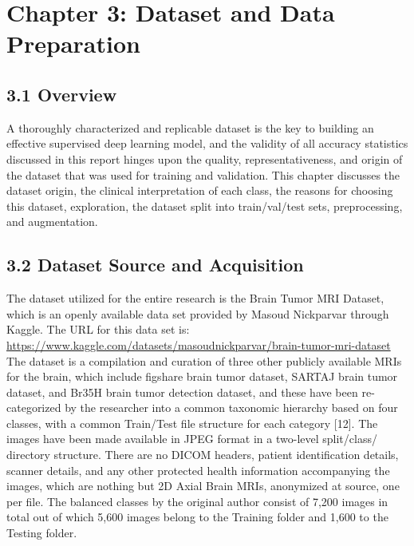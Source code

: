 \documentclass[12pt,a4paper,oneside]{report}
\begin{document}
\chapter*{Chapter 3: Dataset and Data Preparation}
\section*{3.1 Overview}
A thoroughly characterized and replicable dataset is the key to building an effective supervised deep learning model, and the validity of all accuracy statistics discussed in this report hinges upon the quality, representativeness, and origin of the dataset that was used for training and validation. This chapter discusses the dataset origin, the clinical interpretation of each class, the reasons for choosing this dataset, exploration, the dataset split into train/val/test sets, preprocessing, and augmentation.
\section*{3.2 Dataset Source and Acquisition}
The dataset utilized for the entire research is the Brain Tumor MRI Dataset, which is an openly available data set provided by Masoud Nickparvar through Kaggle. The URL for this data set is:
\url{https://www.kaggle.com/datasets/masoudnickparvar/brain-tumor-mri-dataset}
The dataset is a compilation and curation of three other publicly available MRIs for the brain, which include figshare brain tumor dataset, SARTAJ brain tumor dataset, and Br35H brain tumor detection dataset, and these have been re-categorized by the researcher into a common taxonomic hierarchy based on four classes, with a common Train/Test file structure for each category [12].
The images have been made available in JPEG format in a two-level split/class/ directory structure. There are no DICOM headers, patient identification details, scanner details, and any other protected health information accompanying the images, which are nothing but 2D Axial Brain MRIs, anonymized at source, one per file. The balanced classes by the original author consist of 7,200 images in total out of which 5,600 images belong to the Training folder and 1,600 to the Testing folder.
\end{document}
